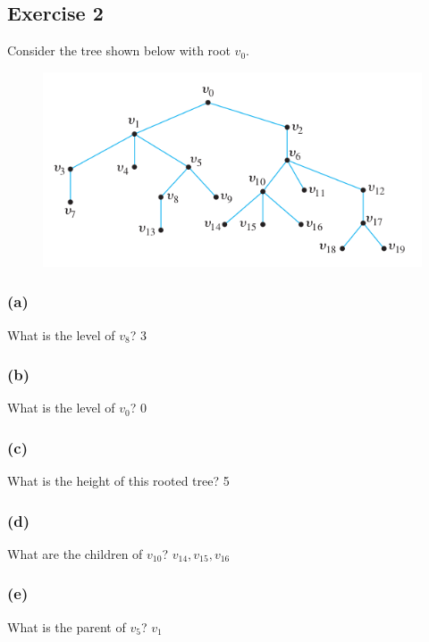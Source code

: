 \documentclass[14pt]{extarticle}
\begin{document}
\subsection{Exercise 2}
Consider the tree shown below with root \(v_0\).

\begin{figure}[ht!]
    \centering
    \includegraphics[scale=0.5]{../images/10.5.2.png}
\end{figure}

\subsubsection{(a)}
What is the level of \(v_8\)? \hspace{2cm}{\it Proof.} 3

\subsubsection{(b)}
What is the level of \(v_0\)? \hspace{2cm}{\it Proof.} 0

\subsubsection{(c)}
What is the height of this rooted tree?
\hspace{2cm}{\it Proof.} 5

\subsubsection{(d)}
What are the children of \(v_{10}\)?
\hspace{2cm}{\it Proof.} \(v_{14}, v_{15}, v_{16}\)

\subsubsection{(e)}
What is the parent of \(v_5\)?
\hspace{2cm}{\it Proof.} \(v_1\)
\end{document}
